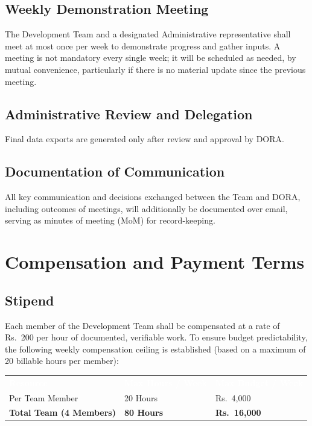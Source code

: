 \documentclass[11pt]{article}
\renewcommand{\arraystretch}{1.15}
\begin{document}
\subsection{Weekly Demonstration Meeting}
The Development Team and a designated Administrative representative shall meet at most once per week to demonstrate progress and gather inputs. A meeting is not mandatory every single week; it will be scheduled as needed, by mutual convenience, particularly if there is no material update since the previous meeting.

\subsection{Administrative Review and Delegation}
Final data exports are generated only after review and approval by DORA.

\subsection{Documentation of Communication}
All key communication and decisions exchanged between the Team and DORA, including outcomes of meetings, will additionally be documented over email, serving as minutes of meeting (MoM) for record-keeping.

\section{Compensation and Payment Terms}
\label{sec:compensation}

\subsection{Stipend}
Each member of the Development Team shall be compensated at a rate of Rs.~200 per hour of documented, verifiable work. To ensure budget predictability, the following weekly compensation ceiling is established (based on a maximum of 20 billable hours per member):

\begin{table}[h]
\centering
\renewcommand{\arraystretch}{1.4}
\begin{tabular}{p{5cm} p{4cm} p{4cm}}
\rowcolor{primary}
\textcolor{white}{\textbf{Resource}} & \textcolor{white}{\textbf{Max Hours / Week}} & \textcolor{white}{\textbf{Max Budget / Week}} \\
\rowcolor{lightbg}
Per Team Member & 20 Hours & Rs.~4,000 \\
\rowcolor{white}
\textbf{Total Team (4 Members)} & \textbf{80 Hours} & \textbf{Rs.~16,000} \\
\end{tabular}
\end{table}
\end{document}
